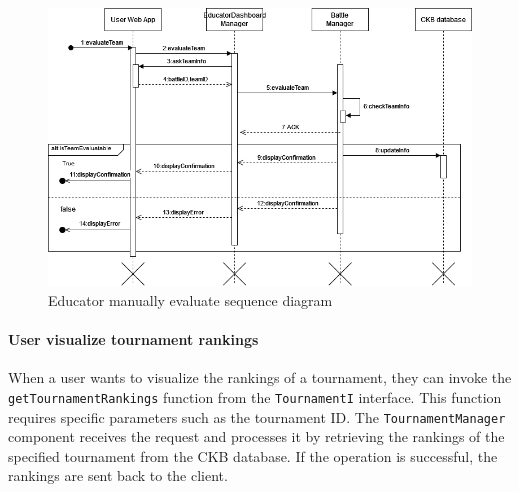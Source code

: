 \begin{figure}[H]
    \begin{center}
        \includegraphics[width=\linewidth]{Images/sequence/Sd_manualEvaluation.png}
        \caption{Educator manually evaluate sequence diagram}
        \label{fig:Educator_manually_evaluate}
    \end{center}
\end{figure}



\paragraph{User visualize tournament rankings}
When a user wants to visualize the rankings of a tournament, they can invoke the \verb|getTournamentRankings| function from the \verb|TournamentI| interface. This function requires specific parameters such as the tournament ID.
The \verb|TournamentManager| component receives the request and processes it by retrieving the rankings of the specified tournament from the CKB database. If the operation is successful, the rankings are sent back to the client.

